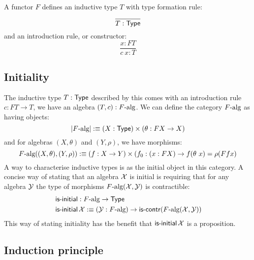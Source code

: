 \documentclass[a4paper,10pt]{article}
\begin{document}
A functor $F$ defines an inductive type $T$ with type formation rule:
$$
\frac{}{T : \mathsf{Type}}
$$
and an introduction rule, or constructor:
$$
\frac{x : FT}{c\ x : T}
$$

\subsection{Initiality}
\label{sec:oitinitiality}

The inductive type $T : \mathsf{Type}$ described by this comes with an
introduction rule $c : FT \to T$, \ie we have an algebra
$(T,c) : F\mbox{-alg}$. We can define the category $F\mbox{-alg}$ as
having objects:
$$
| F\mbox{-alg} | :\equiv (X : \mathsf{Type}) \times (\theta : FX \to X)
$$
and for algebras $(X,\theta)$ and $(Y,\rho)$, we have morphisms:
$$
F\mbox{-alg}((X,\theta),(Y,\rho)) :\equiv (f : X \to Y) \times (f_0 : (x : FX) \to f (\theta\ x) = \rho (F f x)
$$
A way to characterise inductive types is as the initial object in this
category. A concise way of stating that an algebra $\mathcal{X}$ is
initial is requiring that for any algebra $\mathcal{Y}$ the type of
morphisms $F\mbox{-alg}(\mathcal{X},\mathcal{Y})$ is contractible:
%
\begin{align*}
&\operatorname{\mathsf{is-initial}} : F\mbox{-alg} \to \mathsf{Type} \\
&\operatorname{\mathsf{is-initial}} \mathcal{X} :\equiv (\mathcal{Y} : F\mbox{-alg}) \to \operatorname{\mathsf{is-contr}} (F\mbox{-alg}(\mathcal{X},\mathcal{Y}))
\end{align*}
%
This way of stating initiality has the benefit that
$\operatorname{\mathsf{is-initial}} \mathcal{X}$ is a proposition.

\subsection{Induction principle}
\label{sec:oitinduction}
\end{document}
